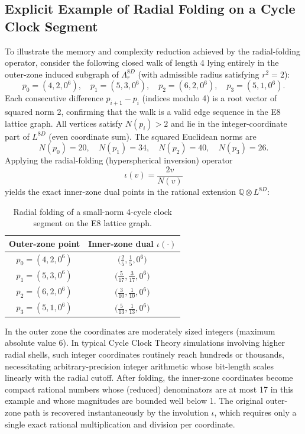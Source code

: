 \documentclass{article}
\begin{document}
\subsection{Explicit Example of Radial Folding on a Cycle Clock Segment}
To illustrate the memory and complexity reduction achieved by the radial-folding operator, consider the following closed walk of length 4 lying entirely in the outer-zone induced subgraph of \(\Lambda_r^{8D}\) (with admissible radius satisfying \(r^2=2\)):
\[
p_0 = (4, 2, 0^6),\quad
p_1 = (5, 3, 0^6),\quad
p_2 = (6, 2, 0^6),\quad
p_3 = (5, 1, 0^6).
\]
Each consecutive difference \(p_{i+1} - p_i\) (indices modulo 4) is a root vector of squared norm 2, confirming that the walk is a valid edge sequence in the E8 lattice graph. All vertices satisfy \(N(p_i) > 2\) and lie in the integer-coordinate part of \(L^{8D}\) (even coordinate sum). The squared Euclidean norms are
\[
N(p_0) = 20,\quad N(p_1) = 34,\quad N(p_2) = 40,\quad N(p_3) = 26.
\]
Applying the radial-folding (hyperspherical inversion) operator
\[
\iota(v) = \frac{2 v}{N(v)}
\]
yields the exact inner-zone dual points in the rational extension \(\mathbb{Q} \otimes L^{8D}\):
\begin{table}[htbp]
\centering
\caption{Radial folding of a small-norm 4-cycle clock segment on the E8 lattice graph.}
\label{tab:radial-fold-example}
\begin{tabular}{c|c}
\textbf{Outer-zone point} & \textbf{Inner-zone dual \(\iota(\cdot)\)} \\
\hline
\(p_0 = (4,2,0^6)\) & \(\bigl( \frac{2}{5},\frac{1}{5},0^6 \bigr)\) \\
\(p_1 = (5,3,0^6)\) & \(\bigl( \frac{5}{17},\frac{3}{17},0^6 \bigr)\) \\
\(p_2 = (6,2,0^6)\) & \(\bigl( \frac{3}{10},\frac{1}{10},0^6 \bigr)\) \\
\(p_3 = (5,1,0^6)\) & \(\bigl( \frac{5}{13},\frac{1}{13},0^6 \bigr)\)
\end{tabular}
\end{table}
In the outer zone the coordinates are moderately sized integers (maximum absolute value 6). In typical Cycle Clock Theory simulations involving higher radial shells, such integer coordinates routinely reach hundreds or thousands, necessitating arbitrary-precision integer arithmetic whose bit-length scales linearly with the radial cutoff. After folding, the inner-zone coordinates become compact rational numbers whose (reduced) denominators are at most 17 in this example and whose magnitudes are bounded well below 1. The original outer-zone path is recovered instantaneously by the involution \(\iota\), which requires only a single exact rational multiplication and division per coordinate.
\end{document}
